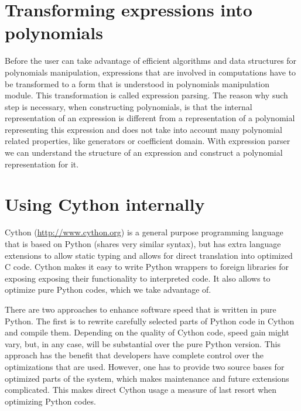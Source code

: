 \section{Transforming expressions into polynomials}

Before the user can take advantage of efficient algorithms and data structures for polynomials
manipulation, expressions that are involved in computations have to be transformed to a form
that is understood in polynomials manipulation module. This transformation is called expression
parsing. The reason why such step is necessary, when constructing polynomials, is that the
internal representation of an expression is different from a representation of a polynomial
representing this expression and does not take into account many polynomial related properties,
like generators or coefficient domain. With expression parser we can understand the structure
of an expression and construct a polynomial representation for it.
\section{Using Cython internally}\label{thesis-cython}

Cython (\href{http://www.cython.org}{http://www.cython.org}) is a general purpose programming language that is based on Python
(shares very similar syntax), but has extra language extensions to allow static typing and
allows for direct translation into optimized C code. Cython makes it easy to write Python
wrappers to foreign libraries for exposing exposing their functionality to interpreted code.
It also allows to optimize pure Python codes, which we take advantage of.

There are two approaches to enhance software speed that is written in pure Python. The first
is to rewrite carefully selected parts of Python code in Cython and compile them. Depending
on the quality of Cython code, speed gain might vary, but, in any case, will be substantial
over the pure Python version. This approach has the benefit that developers have complete
control over the optimizations that are used. However, one has to provide two source bases
for optimized parts of the system, which makes maintenance and future extensions complicated.
This makes direct Cython usage a measure of last resort when optimizing Python codes.

